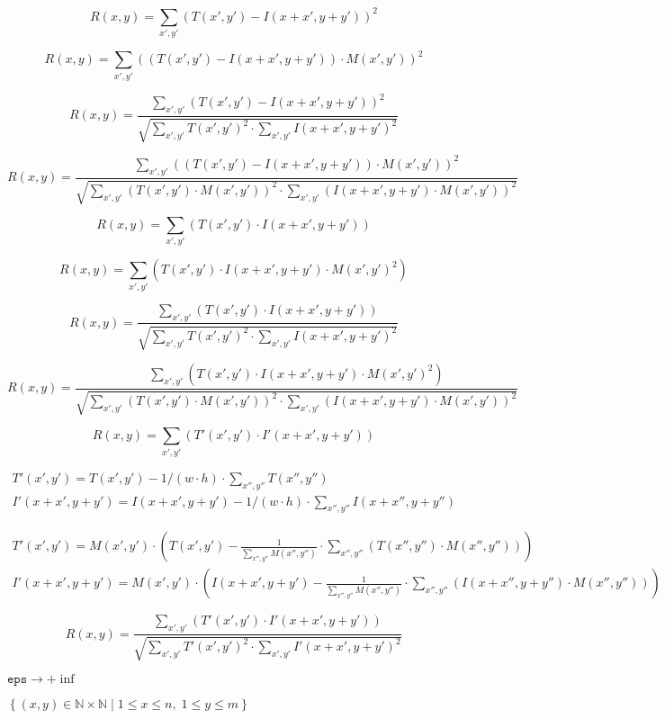 \documentclass{article}
\begin{document}
\[R(x,y)= \sum _{x',y'} (T(x',y')-I(x+x',y+y'))^2\]
\pagebreak

\[R(x,y)= \sum _{x',y'} \left( (T(x',y')-I(x+x',y+y')) \cdot M(x',y') \right)^2\]
\pagebreak

\[R(x,y)= \frac{\sum_{x',y'} (T(x',y')-I(x+x',y+y'))^2}{\sqrt{\sum_{ x',y'}T(x',y')^2 \cdot \sum_{x',y'} I(x+x',y+y')^2}}\]
\pagebreak

\[R(x,y)= \frac{\sum _{x',y'} \left( (T(x',y')-I(x+x',y+y')) \cdot M(x',y') \right)^2}{\sqrt{\sum_{x',y'} \left( T(x',y') \cdot M(x',y') \right)^2 \cdot \sum_{x',y'} \left( I(x+x',y+y') \cdot M(x',y') \right)^2}}\]
\pagebreak

\[R(x,y)= \sum _{x',y'} (T(x',y') \cdot I(x+x',y+y'))\]
\pagebreak

\[R(x,y)= \sum _{x',y'} (T(x',y') \cdot I(x+x',y+y') \cdot M(x',y') ^2)\]
\pagebreak

\[R(x,y)= \frac{\sum_{x',y'} (T(x',y') \cdot I(x+x',y+y'))}{\sqrt{ \sum_{x',y'}T(x',y')^2 \cdot \sum_{x',y'} I(x+x',y+y')^2}}\]
\pagebreak

\[R(x,y)= \frac{\sum_{x',y'} (T(x',y') \cdot I(x+x',y+y') \cdot M(x',y')^2)}{\sqrt{\sum_{x',y'} \left( T(x',y') \cdot M(x',y') \right)^2 \cdot \sum_{x',y'} \left( I(x+x',y+y') \cdot M(x',y') \right)^2}}\]
\pagebreak

\[R(x,y)= \sum _{x',y'} (T'(x',y') \cdot I'(x+x',y+y'))\]
\pagebreak

\[\begin{array}{l} T'(x',y')=T(x',y') - 1/(w \cdot h) \cdot \sum _{ x'',y''} T(x'',y'') \\ I'(x+x',y+y')=I(x+x',y+y') - 1/(w \cdot h) \cdot \sum _{x'',y''} I(x+x'',y+y'') \end{array}\]
\pagebreak

\[\begin{array}{l} T'(x',y')=M(x',y') \cdot \left( T(x',y') - \frac{1}{\sum _{x'',y''} M(x'',y'')} \cdot \sum _{x'',y''} (T(x'',y'') \cdot M(x'',y'')) \right) \\ I'(x+x',y+y')=M(x',y') \cdot \left( I(x+x',y+y') - \frac{1}{\sum _{x'',y''} M(x'',y'')} \cdot \sum _{x'',y''} (I(x+x'',y+y'') \cdot M(x'',y'')) \right) \end{array} \]
\pagebreak

\[R(x,y)= \frac{ \sum_{x',y'} (T'(x',y') \cdot I'(x+x',y+y')) }{ \sqrt{\sum_{x',y'}T'(x',y')^2 \cdot \sum_{x',y'} I'(x+x',y+y')^2} }\]
\pagebreak

$\texttt{eps}\rightarrow +\inf$
\pagebreak

$\left\{(x,y)\in\mathbb{N}\times\mathbb{N}\mid 1\leq x\leq n,\;1\leq y\leq m\right\}$
\pagebreak
\end{document}
